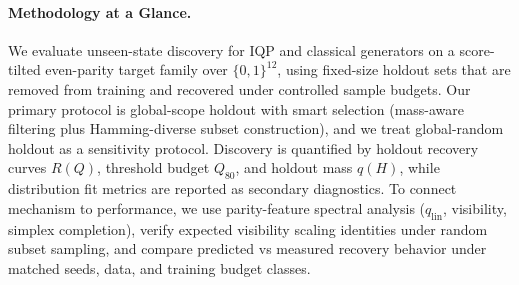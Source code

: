 \paragraph{Methodology at a Glance.}
We evaluate unseen-state discovery for IQP and classical generators on a score-tilted even-parity target family over \(\{0,1\}^{12}\), using fixed-size holdout sets that are removed from training and recovered under controlled sample budgets.
Our primary protocol is global-scope holdout with smart selection (mass-aware filtering plus Hamming-diverse subset construction), and we treat global-random holdout as a sensitivity protocol.
Discovery is quantified by holdout recovery curves \(R(Q)\), threshold budget \(Q_{80}\), and holdout mass \(q(H)\), while distribution fit metrics are reported as secondary diagnostics.
To connect mechanism to performance, we use parity-feature spectral analysis (\(q_{\mathrm{lin}}\), visibility, simplex completion), verify expected visibility scaling identities under random subset sampling, and compare predicted vs measured recovery behavior under matched seeds, data, and training budget classes.

